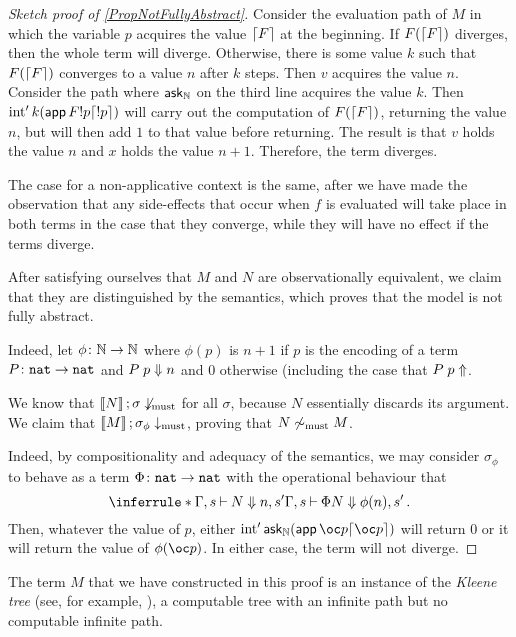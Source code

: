 \documentclass{article}
\begin{document}
\begin{proof}[Sketch proof of \ref{PropNotFullyAbstract}]
  Consider the evaluation path of $M$ in which the variable $p$ acquires the value $\lceil F\rceil$ at the beginning.  
  If $F (\lceil F\rceil)$ diverges, then the whole term will diverge.  
  Otherwise, there is some value $k$ such that $F (\lceil F\rceil)$ converges to a value $n$ after $k$ steps.
  Then $v$ acquires the value $n$.  
  Consider the path where $\operatorname{{\mathsf{ask}}}_{\mathbb{N}}$ on the third line acquires the value $k$.  
  Then $\operatorname{int}' k (\operatorname{\textsf{app}} F !p \lceil!p\rceil)$ will carry out the computation of $F (\lceil F\rceil)$, returning the value $n$, but will then add $1$ to that value before returning.  
  The result is that $v$ holds the value $n$ and $x$ holds the value $n+1$.  
  Therefore, the term diverges.

  The case for a non-applicative context is the same, after we have made the observation that any side-effects that occur when $f$ is evaluated will take place in both terms in the case that they converge, while they will have no effect if the terms diverge.

  After satisfying ourselves that $M$ and $N$ are observationally equivalent, we claim that they are distinguished by the semantics, which proves that the model is not fully abstract.

  Indeed, let $\phi\colon \mathbb{N} \to \mathbb{N}$ where $\phi(p)$ is $n+1$ if $p$ is the encoding of a term $P\colon{\mathtt{nat}} \to {\mathtt{nat}}$ and $P\;p\Downarrow n$ and $0$ otherwise (including the case that $P\;p\Uparrow$.

  We know that $\left\llbracket N\right\rrbracket;\sigma\not\downarrow_{\operatorname{must}}$ for all $\sigma$, because $N$ essentially discards its argument.
  We claim that $\left\llbracket M\right\rrbracket;\sigma_\phi\downarrow_{\operatorname{must}}$, proving that $N\not\sim_{\operatorname{must}} M$.

  Indeed, by compositionality and adequacy of the semantics, we may consider $\sigma_\phi$ to behave as a term $\Phi\colon{\mathtt{nat}} \to {\mathtt{nat}}$ with the operational behaviour that
  \[
    \inferrule*{\Gamma,s\ts N \converges n,s'}{\Gamma,s\ts \Phi N \converges \phi(n),s'}\,.
    \]
  Then, whatever the value of $p$, either $\Int' \ask_{\bN} (\app \oc p \encode{\oc p})$ will return $0$ or it will return the value of $\phi(\oc p)$.  
  In either case, the term will not diverge.
\end{proof}

\begin{remark}
  The term $M$ that we have constructed in this proof is an instance of the \emph{Kleene tree} (see, for example, \cite{KleeneTree}), a computable tree with an infinite path but no computable infinite path.
\end{remark}
\end{document}
